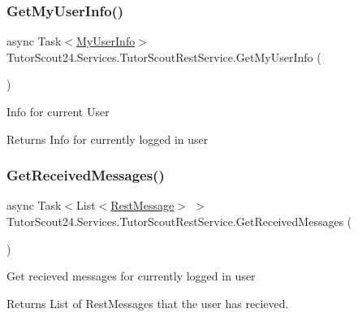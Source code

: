\subsubsection{\texorpdfstring{Get\+My\+User\+Info()}{GetMyUserInfo()}}
{\footnotesize\ttfamily async Task$<$\mbox{\hyperlink{class_tutor_scout24_1_1_models_1_1_user_data_1_1_my_user_info}{My\+User\+Info}}$>$ Tutor\+Scout24.\+Services.\+Tutor\+Scout\+Rest\+Service.\+Get\+My\+User\+Info (\begin{DoxyParamCaption}{ }\end{DoxyParamCaption})\hspace{0.3cm}{\ttfamily [inline]}}



Info for current User 

\begin{DoxyReturn}{Returns}
Info for currently logged in user
\end{DoxyReturn}
\mbox{\label{class_tutor_scout24_1_1_services_1_1_tutor_scout_rest_service_a57ffeca07f199af8f3c5ca8bf8a34b35}} 
\subsubsection{\texorpdfstring{Get\+Received\+Messages()}{GetReceivedMessages()}}
{\footnotesize\ttfamily async Task$<$List$<$\mbox{\hyperlink{class_tutor_scout24_1_1_models_1_1_chat_1_1_rest_message}{Rest\+Message}}$>$ $>$ Tutor\+Scout24.\+Services.\+Tutor\+Scout\+Rest\+Service.\+Get\+Received\+Messages (\begin{DoxyParamCaption}{ }\end{DoxyParamCaption})\hspace{0.3cm}{\ttfamily [inline]}}



Get recieved messages for currently logged in user 

\begin{DoxyReturn}{Returns}
List of Rest\+Messages that the user has recieved.
\end{DoxyReturn}
\mbox{\label{class_tutor_scout24_1_1_services_1_1_tutor_scout_rest_service_a1efcdc1fe62961a72d354f4fe5170d18}} 
